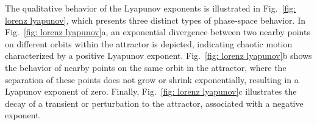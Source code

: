 The qualitative behavior of the Lyapunov exponents is illustrated in Fig.~\ref{fig: lorenz lyapunov}, which presents three distinct types of phase-space behavior. In Fig.~\ref{fig: lorenz lyapunov}a, an exponential divergence between two nearby points on different orbits within the attractor is depicted, indicating chaotic motion characterized by a positive Lyapunov exponent. Fig.~\ref{fig: lorenz lyapunov}b shows the behavior of nearby points on the same orbit in the attractor, where the separation of these points does not grow or shrink exponentially, resulting in a Lyapunov exponent of zero. Finally, Fig.~\ref{fig: lorenz lyapunov}c illustrates the decay of a transient or perturbation to the attractor, associated with a negative exponent.



